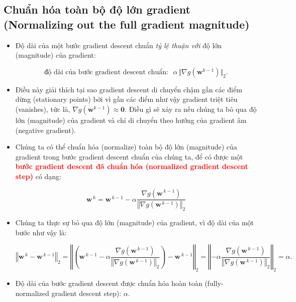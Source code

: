 \documentclass{book}
\begin{document}
\subsection{Chuẩn hóa toàn bộ độ lớn gradient (Normalizing out the full gradient magnitude)}
\begin{itemize}
    \item Độ dài của một bước gradient descent chuẩn \textit{tỷ lệ thuận với} độ lớn (magnitude) của gradient:

    \begin{equation*}
        \text{độ dài của bước gradient descent chuẩn:} \,\,\,\, \alpha \, \Vert \nabla g(\mathbf{w}^{k-1}) \Vert_2.
    \end{equation*}
    \item Điều này giải thích tại sao gradient descent di chuyển chậm gần các điểm dừng (stationary points) bởi vì gần các điểm như vậy gradient triệt tiêu (vanishes), tức là, $\nabla g(\mathbf{w}^{k-1}) \approx \mathbf{0}$. Điều gì sẽ xảy ra nếu chúng ta bỏ qua độ lớn (magnitude) của gradient và chỉ di chuyển theo hướng của gradient âm (negative gradient).
    \item Chúng ta có thể chuẩn hóa (normalize) toàn bộ độ lớn (magnitude) của gradient trong bước gradient descent chuẩn của chúng ta, để có được một \textbf{\textcolor{red}{bước gradient descent đã chuẩn hóa (normalized gradient descent step)}} có dạng:

    \begin{equation*}
        \mathbf{w}^{\,k} = \mathbf{w}^{\,k-1} - \alpha \frac{\nabla g(\mathbf{w}^{\,k-1})}{\left\Vert \nabla g(\mathbf{w}^{\,k-1}) \right\Vert_2 }
    \end{equation*}
    \item Chúng ta thực sự bỏ qua độ lớn (magnitude) của gradient, vì độ dài của một bước như vậy là:
        
    \begin{equation*}
        \left\Vert \mathbf{w}^{\,k} - \mathbf{w}^{\,k-1} \right\Vert_2 = \left\Vert \left(\mathbf{w}^{\,k-1} - \alpha \frac{\nabla g(\mathbf{w}^{\,k-1})}{\left\Vert \nabla g(\mathbf{w}^{\,k-1}) \right\Vert_2} \right)- \mathbf{w}^{\,k-1} \right\Vert_2 = \left\Vert -\alpha \frac{\nabla g(\mathbf{w}^{\,k-1})}{\left\Vert \nabla g(\mathbf{w}^{\,k-1}) \right\Vert_2 }\right\Vert_2  = \alpha.
    \end{equation*}    
    \item Độ dài của bước gradient descent được chuẩn hóa hoàn toàn (fully-normalized gradient descent step): $\alpha$.
\end{itemize}
\end{document}
